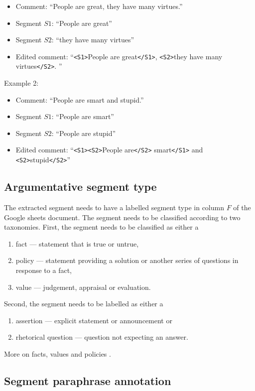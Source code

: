 \begin{itemize}
  \item[] Comment: ``People are great, they have many virtues.''
  \item[] Segment $S1$: ``People are great''
  \item[] Segment $S2$: ``they have many virtues''
  \item[] Edited comment: ``\texttt{<S1>}People are great\texttt{</S1>},
  \texttt{<S2>}they have many virtues\texttt{</S2>}. ''
\end{itemize}

\noindent Example 2:
\begin{itemize}
\item[] Comment: ``People are smart and stupid.''
\item[] Segment $S1$: ``People are smart''
\item[] Segment $S2$: ``People are stupid''
\item[] Edited comment: ``\texttt{<S1><S2>}People are\texttt{</S2>} smart\texttt{</S1>}
and \texttt{<S2>}stupid\texttt{</S2>}''
\end{itemize}

\subsection*{Argumentative segment type}

The extracted segment needs to have a labelled segment type in column $F$ of
the Google sheets document. The segment needs to be classified according to two
taxonomies. First, the segment needs to be classified as either a 
\begin{enumerate}
\item fact --- statement that is true or untrue,
\item policy --- statement providing a solution or another series of questions in response to a fact,
\item value --- judgement, appraisal or evaluation. 
\end{enumerate}
Second, the segment needs to be labelled as either a 
\begin{enumerate}
\item assertion --- explicit statement or announcement or
\item rhetorical question --- question not expecting an answer. 
\end{enumerate}
More on facts, values and policies \citep{factvaluepolicy}.

\subsection*{Segment paraphrase annotation}

